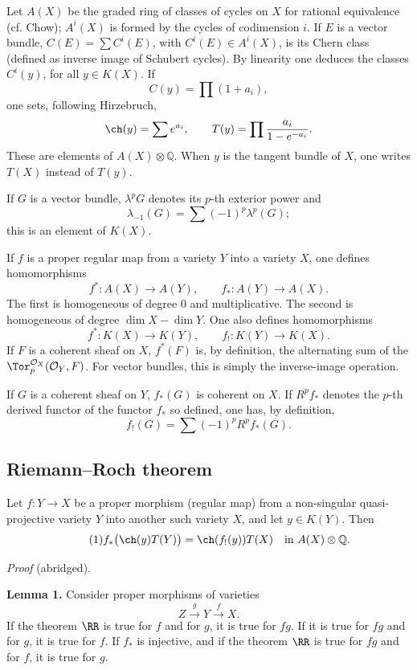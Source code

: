 Let \(A(X)\) be the graded ring of classes of cycles on \(X\) for rational equivalence (cf. Chow); \(A^i(X)\) is formed by the cycles of codimension \(i\). If \(E\) is a vector bundle, \(C(E)=\sum C^i(E)\), with \(C^i(E)\in A^i(X)\), is its Chern class (defined as inverse image of Schubert cycles). By linearity one deduces the classes \(C^i(y)\), for all \(y\in K(X)\). If
\[
  C(y)=\prod (1+a_i),
\]
one sets, following Hirzebruch,
\[
  \ch(y)=\sum e^{a_i},\qquad
  T(y)=\prod\frac{a_i}{1-e^{-a_i}}.
\]
These are elements of \(A(X)\otimes\mathbb Q\). When \(y\) is the tangent bundle of \(X\), one writes \(T(X)\) instead of \(T(y)\).

If \(G\) is a vector bundle, \(\lambda^pG\) denotes its \(p\)-th exterior power and
\[
  \lambda_{-1}(G)=\sum(-1)^p\lambda^p(G);
\]
this is an element of \(K(X)\).

If \(f\) is a proper regular map from a variety \(Y\) into a variety \(X\), one defines homomorphisms
\[
  f^*:A(X)\longrightarrow A(Y),\qquad
  f_*:A(Y)\longrightarrow A(X).
\]
The first is homogeneous of degree \(0\) and multiplicative. The second is homogeneous of degree \(\dim X-\dim Y\). One also defines homomorphisms
\[
  f^*:K(X)\longrightarrow K(Y),\qquad
  f_!:K(Y)\longrightarrow K(X).
\]
If \(F\) is a coherent sheaf on \(X\), \(f^*(F)\) is, by definition, the alternating sum of the \(\Tor_p^{\mathcal O_X}(\mathcal O_Y,F)\). For vector bundles, this is simply the inverse-image operation.

If \(G\) is a coherent sheaf on \(Y\), \(f_*(G)\) is coherent on \(X\). If \(R^pf_*\) denotes the \(p\)-th derived functor of the functor \(f_*\) so defined, one has, by definition,
\[
  f_!(G)=\sum(-1)^p R^pf_*(G).
\]

\subsection*{Riemann--Roch theorem}
Let \(f:Y\to X\) be a proper morphism (regular map) from a non-singular quasi-projective variety \(Y\) into another such variety \(X\), and let \(y\in K(Y)\). Then
\begin{equation}\tag{1}
  f_*\bigl(\ch(y)T(Y)\bigr)=\ch(f_!(y))T(X)
  \quad\text{in } A(X)\otimes\mathbb Q.
\end{equation}

\emph{Proof} (abridged).

\textbf{Lemma 1.} Consider proper morphisms of varieties
\[
  Z \xrightarrow{g} Y \xrightarrow{f} X.
\]
If the theorem \(\RR\) is true for \(f\) and for \(g\), it is true for \(fg\). If it is true for \(fg\) and for \(g\), it is true for \(f\). If \(f_*\) is injective, and if the theorem \(\RR\) is true for \(fg\) and for \(f\), it is true for \(g\).

